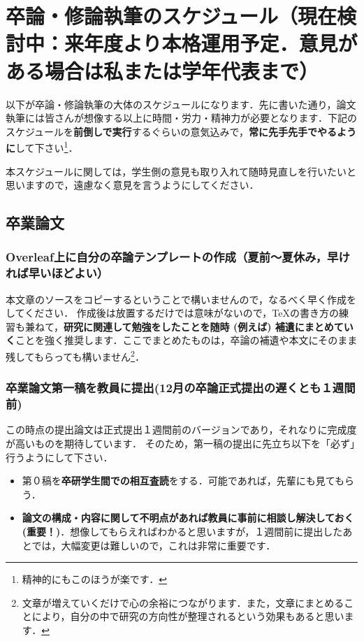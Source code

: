 \documentclass[dvipdfmx,autodetect-engine]{jsreport}
\begin{document}
\chapter{卒論・修論執筆のスケジュール（現在検討中：来年度より本格運用予定．意見がある場合は私または学年代表まで）}

以下が卒論・修論執筆の大体のスケジュールになります．先に書いた通り，論文執筆には皆さんが想像する以上に時間・労力・精神力が必要となります．下記のスケジュールを\textbf{前倒しで実行}するぐらいの意気込みで，\textbf{常に先手先手でやるように}して下さい\footnote{精神的にもこのほうが楽です．}．

本スケジュールに関しては，学生側の意見も取り入れて随時見直しを行いたいと思いますので，遠慮なく意見を言うようにしてください．

\section{卒業論文}


\subsection{Overleaf上に自分の卒論テンプレートの作成（夏前〜夏休み，早ければ早いほどよい）}

本文章のソースをコピーするということで構いませんので，なるべく早く作成をしてください．
作成後は放置するだけでは意味がないので，\TeX の書き方の練習も兼ねて，\textbf{研究に関連して勉強をしたことを随時 (例えば) 補遺にまとめていく}ことを強く推奨します．ここでまとめたものは，卒論の補遺や本文にそのまま残してもらっても構いません\footnote{文章が増えていくだけで心の余裕につながります．また，文章にまとめることにより，自分の中で研究の方向性が整理されるという効果もあると思います．}．

\subsection{卒業論文第一稿を教員に提出(12月の卒論正式提出の遅くとも１週間前)}

この時点の提出論文は正式提出１週間前のバージョンであり，それなりに完成度が高いものを期待しています．
そのため，第一稿の提出に先立ち以下を「必ず」行うようにして下さい．
\begin{itemize}
\item 第０稿を\textbf{卒研学生間での相互査読}をする．可能であれば，先輩にも見てもらう．
\item \textbf{論文の構成・内容に関して不明点があれば教員に事前に相談し解決しておく(重要！)}．想像してもらえればわかると思いますが，１週間前に提出したあとでは，大幅変更は難しいので，これは非常に重要です．
\end{itemize}
\end{document}
